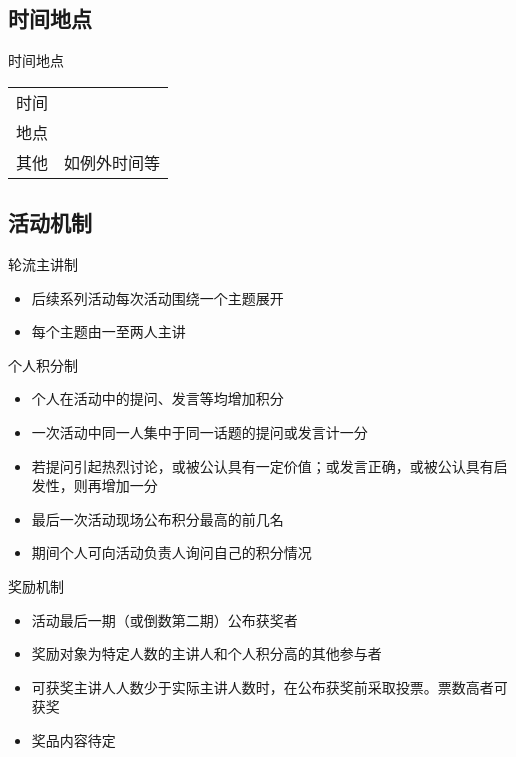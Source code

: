 \documentclass{beamer}
\newcommand{\opt}[1]{{\color{gray} #1}}
\begin{document}
\subsection{时间地点}
\begin{frame}{时间地点}
\begin{tabular}{lc}
时间 \\
地点 \\
其他 & \opt{如例外时间等} \\
\end{tabular}
\end{frame}

\subsection{活动机制}
\begin{frame}{轮流主讲制}
\begin{itemize}
\item 后续系列活动每次活动围绕一个主题展开
\item 每个主题由一至两人主讲
\end{itemize}
\end{frame}

\begin{frame}{个人积分制}
\begin{itemize}
\item 个人在活动中的提问、发言等均增加积分
\item 一次活动中同一人集中于同一话题的提问或发言计一分
\item 若提问引起热烈讨论，或被公认具有一定价值；或发言正确，或被公认具有启发性，则再增加一分
\item 最后一次活动现场公布积分最高的前几名
\item 期间个人可向活动负责人询问自己的积分情况
\end{itemize}
\end{frame}

\begin{frame}{奖励机制}
\begin{itemize}
\item 活动最后一期（或倒数第二期）公布获奖者
\item 奖励对象为特定人数的主讲人和个人积分高的其他参与者
\item 可获奖主讲人人数少于实际主讲人数时，在公布获奖前采取投票。票数高者可获奖
\item 奖品内容待定
\end{itemize}
\end{frame}

\end{document}
